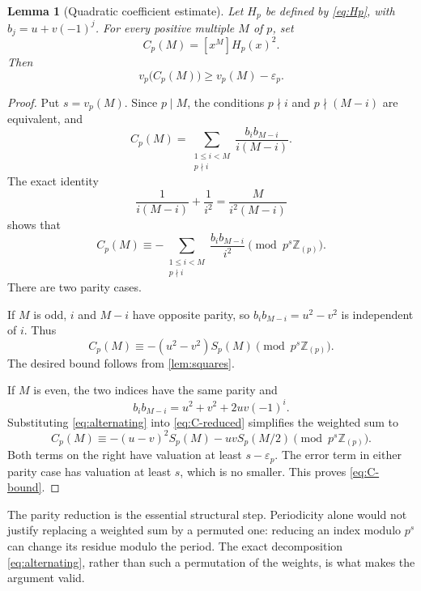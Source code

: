 \documentclass[11pt,a4paper]{article}
\numberwithin{equation}{section}
\newtheorem{lemma}[lemma]{Lemma}
\theoremstyle{definition}
\theoremstyle{remark}
\newcommand{\Z}{\mathbb Z}
\newcommand{\Zp}{\Z_{(p)}}
\newcommand{\vp}{v_p}
\newcommand{\epsp}{\varepsilon_p}
\newcommand{\Sp}{S_p}
\newcommand{\Hp}{H_p}
\newcommand{\Cp}{C_p}
\newcommand{\pmodring}[1]{\pmod{#1\Zp}}
\begin{document}
\begin{lemma}[Quadratic coefficient estimate]\label{lem:quadratic}
Let $\Hp$ be defined by \eqref{eq:Hp}, with $b_j=u+v(-1)^j$.
For every positive multiple $M$ of $p$, set
\[
 \Cp(M)=[x^M]\Hp(x)^2.
\]
Then
\begin{equation}\label{eq:C-bound}
 \vp\bigl(\Cp(M)\bigr)\geq\vp(M)-\epsp.
\end{equation}
\end{lemma}
\begin{proof}
Put $s=\vp(M)$. Since $p\mid M$, the conditions $p\nmid i$ and
$p\nmid(M-i)$ are equivalent, and
\begin{equation}\label{eq:C-expanded}
 \Cp(M)=\sum_{\substack{1\leq i<M\\p\nmid i}}
 \frac{b_i b_{M-i}}{i(M-i)}.
\end{equation}
The exact identity
\[
 \frac1{i(M-i)}+\frac1{i^2}=\frac{M}{i^2(M-i)}
\]
shows that
\begin{equation}\label{eq:C-reduced}
 \Cp(M)\equiv-
 \sum_{\substack{1\leq i<M\\p\nmid i}}\frac{b_i b_{M-i}}{i^2}
 \pmodring{p^s}.
\end{equation}
There are two parity cases.

If $M$ is odd, $i$ and $M-i$ have opposite parity, so
$b_i b_{M-i}=u^2-v^2$ is independent of $i$. Thus
\begin{equation}\label{eq:C-odd}
 \Cp(M)\equiv-(u^2-v^2)\Sp(M)\pmodring{p^s}.
\end{equation}
The desired bound follows from \cref{lem:squares}.

If $M$ is even, the two indices have the same parity and
\[
 b_i b_{M-i}=u^2+v^2+2uv(-1)^i.
\]
Substituting \eqref{eq:alternating} into \eqref{eq:C-reduced} simplifies
the weighted sum to
\begin{equation}\label{eq:C-even}
 \Cp(M)\equiv-(u-v)^2\Sp(M)-uv\Sp(M/2)
 \pmodring{p^s}.
\end{equation}
Both terms on the right have valuation at least $s-\epsp$.
The error term in either parity case has valuation at least $s$, which
is no smaller. This proves \eqref{eq:C-bound}.
\end{proof}

The parity reduction is the essential structural step. Periodicity
alone would not justify replacing a weighted sum by a permuted one:
reducing an index modulo $p^s$ can change its residue modulo the period.
The exact decomposition \eqref{eq:alternating}, rather than such a
permutation of the weights, is what makes the argument valid.
\end{document}
